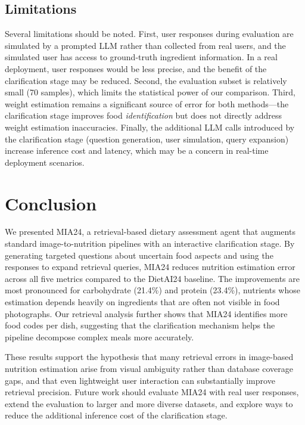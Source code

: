 \documentclass[11pt]{article}
\begin{document}
\subsection{Limitations}

Several limitations should be noted.
First, user responses during evaluation are simulated by a prompted LLM rather than collected from real users, and the simulated user has access to ground-truth ingredient information.
In a real deployment, user responses would be less precise, and the benefit of the clarification stage may be reduced.
Second, the evaluation subset is relatively small (70 samples), which limits the statistical power of our comparison.
Third, weight estimation remains a significant source of error for both methods---the clarification stage improves food \emph{identification} but does not directly address weight estimation inaccuracies.
Finally, the additional LLM calls introduced by the clarification stage (question generation, user simulation, query expansion) increase inference cost and latency, which may be a concern in real-time deployment scenarios.

\section{Conclusion}
\label{sec:conclusion}

We presented MIA24, a retrieval-based dietary assessment agent that augments standard image-to-nutrition pipelines with an interactive clarification stage.
By generating targeted questions about uncertain food aspects and using the responses to expand retrieval queries, MIA24 reduces nutrition estimation error across all five metrics compared to the DietAI24 baseline.
The improvements are most pronounced for carbohydrate (21.4\%) and protein (23.4\%), nutrients whose estimation depends heavily on ingredients that are often not visible in food photographs.
Our retrieval analysis further shows that MIA24 identifies more food codes per dish, suggesting that the clarification mechanism helps the pipeline decompose complex meals more accurately.

These results support the hypothesis that many retrieval errors in image-based nutrition estimation arise from visual ambiguity rather than database coverage gaps, and that even lightweight user interaction can substantially improve retrieval precision.
Future work should evaluate MIA24 with real user responses, extend the evaluation to larger and more diverse datasets, and explore ways to reduce the additional inference cost of the clarification stage.



\end{document}
